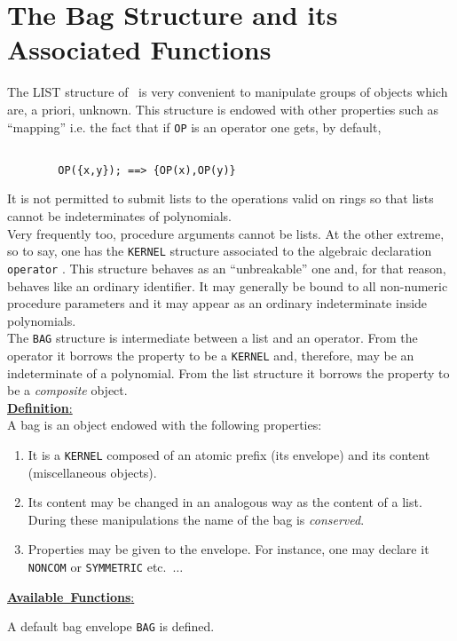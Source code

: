 \section{ The Bag Structure and its Associated Functions}
The LIST structure of \REDUCE\ is very convenient to manipulate
groups of objects which are, a priori, unknown. This structure is
endowed with other properties such as ``mapping'' i.e. the fact that
if \verb+OP+ is an operator one gets, by default,
\begin{verbatim}

        OP({x,y}); ==> {OP(x),OP(y)}

\end{verbatim}
It is not permitted to submit lists to the operations valid on rings
so that lists cannot be indeterminates of polynomials.\\
Very frequently too, procedure arguments cannot be lists.
At the other extreme, so to say, one has the \verb+KERNEL+
structure associated
to the algebraic declaration \verb+operator+ .  This structure behaves as
an ``unbreakable'' one and, for that reason, behaves
like an ordinary identifier.
It may generally be bound to all non-numeric procedure parameters
and it may appear
as an ordinary indeterminate inside polynomials. \\
The \verb+BAG+ structure is intermediate between a list and an operator.
From the operator it borrows the property to be a \verb+KERNEL+ and,
therefore, may be an indeterminate of a polynomial. From the list structure
it borrows the property to be a {\em composite} object.\\[5pt]
\mbox{\underline{{\bf Definition}:\hfill}}\\[4pt]
A bag is an object endowed with the following properties:
\begin{enumerate}
\item It is a \verb+KERNEL+ composed of an atomic prefix (its
envelope) and
its content (miscellaneous objects).
\item Its content may be changed in an analogous way as the content of a
list. During these manipulations the name of the bag is {\em conserved}.
\item Properties may be given to the envelope. For instance, one may
declare it \verb+NONCOM+ or \verb+SYMMETRIC+ etc.\ $\ldots$
\end{enumerate}
\vspace{5pt}
\mbox{\underline{{\bf Available Functions}:\hfill}}
\bi
\item[i.] A default bag envelope \verb+BAG+ is defined.
